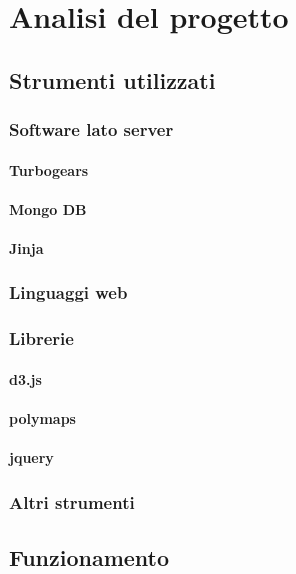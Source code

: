 \chapter{Analisi del progetto}
	
	\section{Strumenti utilizzati}
		\subsection{Software lato server}%
			\subsubsection{Turbogears}
			\subsubsection{Mongo DB}
			\subsubsection{Jinja}%
		\subsection{Linguaggi web}
		\subsection{Librerie}
			\subsubsection{d3.js}
			\subsubsection{polymaps}
			\subsubsection{jquery}
		\subsection{Altri strumenti}
			
	\section{Funzionamento}%